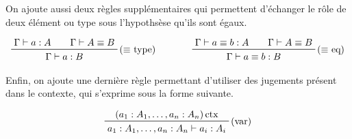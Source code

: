 \documentclass[../../rapport.tex]{subfiles}
\begin{document}
  On ajoute aussi deux règles supplémentaires qui permettent d'échanger le rôle de deux élément ou type sous l'hypothsèse qu'ils sont égaux.

  $$
  \prfinterspace=2em
  \begin{array}{cc}
    \prftree[r]{($\equiv$ type)}{\Gamma \vdash a : A}{\Gamma \vdash A \equiv B}{\Gamma \vdash a : B} \hspace{1cm}
    & \prftree[r]{($\equiv$ eq)}{\Gamma \vdash a \equiv b : A}{\Gamma \vdash A \equiv B}{\Gamma \vdash a \equiv b : B}
  \end{array}
  $$

  Enfin, on ajoute une dernière règle permettant d'utiliser des jugements présent dans le contexte, qui s'exprime sous la forme suivante.

  $$
  \prftree[r]{(var)}
    {(a_1 : A_1, \hdots, a_n : A_n) \ctx}
    {a_1 : A_1, \hdots, a_n : A_n \vdash a_i : A_i}
  $$
\end{document}
